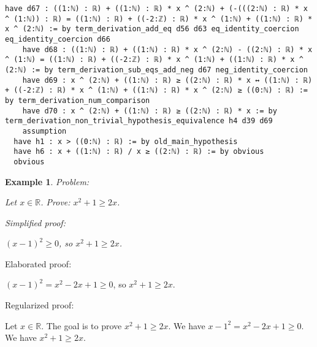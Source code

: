 \documentclass{article}
\newtheorem{example}{Example}
\begin{document}
\begin{tcolorbox}[colback=white!10, width=\linewidth]
\begin{lstlisting}[language=Lean4]
    have d67 : ((1:ℕ) : ℝ) + ((1:ℕ) : ℝ) * x ^ (2:ℕ) + (-(((2:ℕ) : ℝ) * x ^ (1:ℕ)) : ℝ) = ((1:ℕ) : ℝ) + ((-2:ℤ) : ℝ) * x ^ (1:ℕ) + ((1:ℕ) : ℝ) * x ^ (2:ℕ) := by term_derivation_add_eq d56 d63 eq_identity_coercion eq_identity_coercion d66
    have d68 : ((1:ℕ) : ℝ) + ((1:ℕ) : ℝ) * x ^ (2:ℕ) - ((2:ℕ) : ℝ) * x ^ (1:ℕ) = ((1:ℕ) : ℝ) + ((-2:ℤ) : ℝ) * x ^ (1:ℕ) + ((1:ℕ) : ℝ) * x ^ (2:ℕ) := by term_derivation_sub_eqs_add_neg d67 neg_identity_coercion
    have d69 : x ^ (2:ℕ) + ((1:ℕ) : ℝ) ≥ ((2:ℕ) : ℝ) * x ↔ ((1:ℕ) : ℝ) + ((-2:ℤ) : ℝ) * x ^ (1:ℕ) + ((1:ℕ) : ℝ) * x ^ (2:ℕ) ≥ ((0:ℕ) : ℝ) := by term_derivation_num_comparison
    have d70 : x ^ (2:ℕ) + ((1:ℕ) : ℝ) ≥ ((2:ℕ) : ℝ) * x := by term_derivation_non_trivial_hypothesis_equivalence h4 d39 d69
    assumption
  have h1 : x > ((0:ℕ) : ℝ) := by old_main_hypothesis
  have h6 : x + ((1:ℕ) : ℝ) / x ≥ ((2:ℕ) : ℝ) := by obvious
  obvious

\end{lstlisting}
\end{tcolorbox}


\begin{example}
Problem:
\begin{tcolorbox}[colback=yellow!10, width=\linewidth]
Let $x\in\mathbb{R}$. Prove: $x^2 + 1\ge 2x$.
\end{tcolorbox}

Simplified proof:
\begin{tcolorbox}[colback=blue!10, width=\linewidth]
$(x-1)^2 \ge 0$, so $x^2 + 1 \ge 2x$.
\end{tcolorbox}
\end{example}

Elaborated proof:
\begin{tcolorbox}[colback=green!10, width=\linewidth]
$(x-1)^2 = x^2 - 2x + 1 \ge 0$, so $x^2 + 1 \ge 2x$.
\end{tcolorbox}

Regularized proof:
\begin{tcolorbox}[colback=red!10, width=\linewidth]
Let $x\in\mathbb{R}$.
The goal is to prove $x^2 + 1 \ge 2x$.
We have ${{x-1}}^2 = x^2 - 2x + 1 \ge 0$.
We have $x^2 + 1 \ge 2x$.
\end{tcolorbox}
\end{document}

